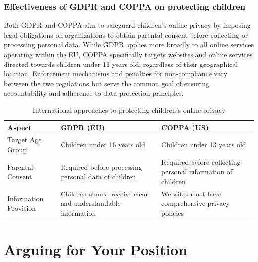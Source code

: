 \documentclass[a4paper, 10 pt, conference]{ieeeconf}  %
\begin{document}
\subsubsection{Effectiveness of GDPR and COPPA on protecting children}
Both GDPR and COPPA aim to safeguard children's online privacy by imposing legal obligations on organizations to obtain parental consent before collecting or processing personal data. While GDPR applies more broadly to all online services operating within the EU, COPPA specifically targets websites and online services directed towards children under 13 years old, regardless of their geographical location. Enforcement mechanisms and penalties for non-compliance vary between the two regulations but serve the common goal of ensuring accountability and adherence to data protection principles.
\begin{table}[h]
    \centering
    \begin{tabularx}{0.5\textwidth}{|C|C|C|} %
        \hline
        \textbf{Aspect} & \textbf{GDPR (EU)} & \textbf{COPPA (US)} \\
        \hline
        Target Age Group & Children under 16 years old & Children under 13 years old \\
        \hline
        Parental Consent & Required before processing personal data of children & Required before collecting personal information of children \\
        \hline
        Information Provision & Children should receive clear and understandable information & Websites must have comprehensive privacy policies \\
        \hline
    \end{tabularx}
    \caption{International approaches to protecting children’s online privacy}
    \label{tab:example}
\end{table}




\section{Arguing for Your Position}
\end{document}

